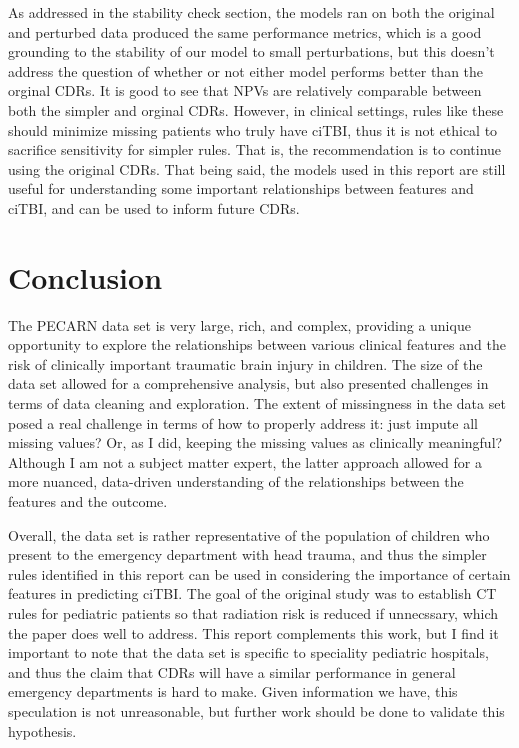 \documentclass[10pt,letterpaper]{article}
\begin{document}
As addressed in the stability check section, the models ran on both the original and perturbed data produced the same performance metrics, which is a good grounding to the stability of our model to small perturbations, but this doesn't address the question of whether or not either model performs better than the orginal CDRs. It is good to see that NPVs are relatively comparable between both the simpler and orginal CDRs. However, in clinical settings, rules like these should minimize missing patients who truly have ciTBI, thus it is not ethical to sacrifice sensitivity for simpler rules. That is, the recommendation is to continue using the original CDRs. That being said, the models used in this report are still useful for understanding some important relationships between features and ciTBI, and can be used to inform future CDRs.

\section{Conclusion}\label{conclusion}

The PECARN data set is very large, rich, and complex, providing a unique opportunity to explore the relationships between various clinical features and the risk of clinically important traumatic brain injury in children. The size of the data set allowed for a comprehensive analysis, but also presented challenges in terms of data cleaning and exploration. The extent of missingness in the data set posed a real challenge in terms of how to properly address it: just impute all missing values? Or, as I did, keeping the missing values as clinically meaningful? Although I am not a subject matter expert, the latter approach allowed for a more nuanced, data-driven understanding of the relationships between the features and the outcome.

Overall, the data set is rather representative of the population of children who present to the emergency department with head trauma, and thus the simpler rules identified in this report can be used in considering the importance of certain features in predicting ciTBI. The goal of the original study was to establish CT rules for pediatric patients so that radiation risk is reduced if unnecssary, which the paper does well to address. This report complements this work, but I find it important to note that the data set is specific to speciality pediatric hospitals, and thus the claim that CDRs will have a similar performance in general emergency departments is hard to make. Given information we have, this speculation is not unreasonable, but further work should be done to validate this hypothesis.
\end{document}

